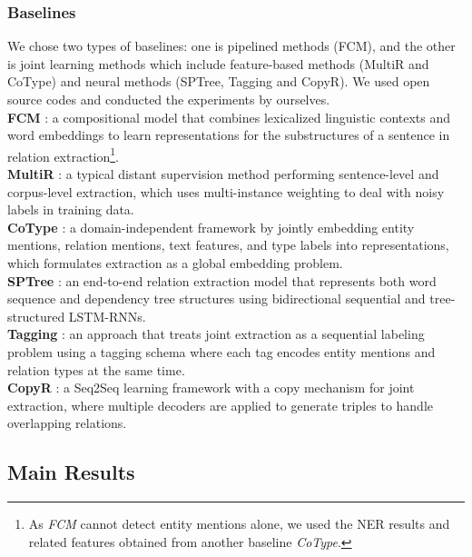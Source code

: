 \documentclass[letterpaper]{article}
\theoremstyle{definition}
\begin{document}
\subsubsection{Baselines}
We chose two types of baselines: one is pipelined methods (FCM), and the other is joint learning methods which include feature-based methods (MultiR and CoType) and neural methods (SPTree, Tagging and CopyR). We used open source codes and conducted the experiments by ourselves.
\\
\textbf{FCM} \cite{gormley2015improved}: a compositional model that combines lexicalized linguistic contexts and word embeddings to learn representations for the substructures of a sentence in relation extraction\footnote{As \textit{FCM} cannot detect entity mentions alone, we used the NER results and related features obtained from another baseline \textit{CoType}.}.
\\
\textbf{MultiR} \cite{hoffmann2011knowledge}: a typical distant supervision method performing sentence-level and corpus-level extraction, which uses multi-instance weighting to deal with noisy labels in training data.
\\
\textbf{CoType} \cite{ren2017cotype}: a domain-independent framework by jointly embedding entity mentions, relation mentions, text features, and type labels into representations, which formulates extraction as a global embedding problem.
\\
\textbf{SPTree} \cite{miwa2016end}: an end-to-end relation extraction model that represents both word sequence and dependency tree structures using bidirectional sequential and tree-structured LSTM-RNNs.
\\
\textbf{Tagging} \cite{zheng2017joint}: an approach that treats joint extraction as a sequential labeling problem using a tagging schema where each tag encodes entity mentions and relation types at the same time.
\\
\textbf{CopyR} \cite{zeng2018extracting}: a Seq2Seq learning framework with a copy mechanism for joint extraction, where multiple decoders are applied to generate triples to handle overlapping relations.

\subsection{Main Results}
\end{document}
